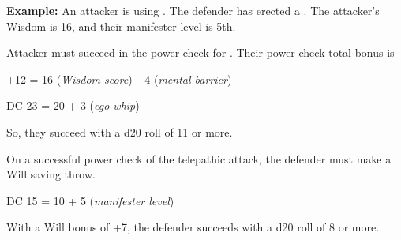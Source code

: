 
\textbf{Example:} An attacker is using . The defender has erected a . The attacker's Wisdom is 16, and their manifester level is 5th.
\begin{enumerate*}
	\item Attacker must succeed in the power check for . Their power check total bonus is

	\begin{Formula}{+12 = 16 (\textit{Wisdom score}) $-4$ (\textit{mental barrier})}\end{Formula}
	\begin{Formula}{DC 23 = 20 + 3 (\textit{ego whip})}\end{Formula}

	So, they succeed with a d20 roll of 11 or more.


	\item On a successful power check of the telepathic attack, the defender must make a Will saving throw.

	\begin{Formula}{DC 15 = 10 + 5 (\textit{manifester level})}\end{Formula}

	With a Will bonus of +7, the defender succeeds with a d20 roll of 8 or more.
\end{enumerate*}
